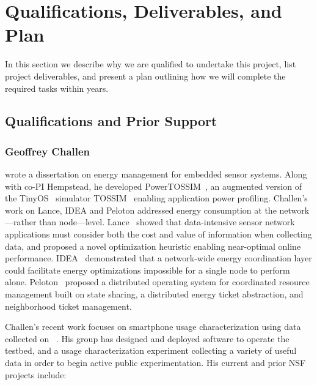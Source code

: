 
\section{Qualifications, Deliverables, and Plan}

In this section we describe why we are qualified to undertake this project,
list project deliverables, and present a plan outlining how we will complete
the required tasks within  years.

\subsection{Qualifications and Prior Support}
\label{section-qualifications}

\subsubsection{Geoffrey Challen\space} wrote a dissertation on energy
management for embedded sensor systems. Along with co-PI Hempstead, he
developed PowerTOSSIM~\cite{powertossim-sensys04}, an augmented version of
the TinyOS~\cite{tinyos-asplos00} simulator TOSSIM~\cite{tossim-sensys03}
enabling application power profiling. Challen's work on Lance, IDEA and
Peloton addressed energy consumption at the network---rather than
node---level. Lance~\cite{lance-sensys08} showed that data-intensive sensor
network applications must consider both the cost and value of information
when collecting data, and proposed a novel optimization heuristic enabling
near-optimal online performance. IDEA~\cite{idea-mobisys10} demonstrated that
a network-wide energy coordination layer could facilitate energy
optimizations impossible for a single node to perform alone.
Peloton~\cite{peloton-hotos09} proposed a distributed operating system for
coordinated resource management built on state sharing, a distributed energy
ticket abstraction, and neighborhood ticket management.

Challen's recent work focuses on smartphone usage characterization using data
collected on \PhoneLab{}~\cite{phonelab-sensemine13}. His group has designed
and deployed software to operate the testbed, and a usage characterization
experiment collecting a variety of useful data in order to begin active
public experimentation. His current and prior NSF projects include:

